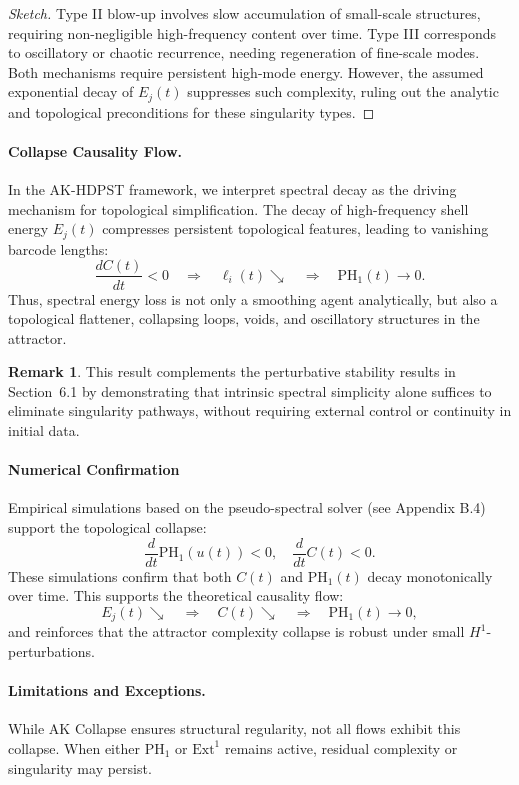 \documentclass[11pt]{article}
\theoremstyle{definition}
\newtheorem{remark}[theorem]{Remark}
\begin{document}
\begin{proof}[Sketch]
Type II blow-up involves slow accumulation of small-scale structures, requiring non-negligible high-frequency content over time. Type III corresponds to oscillatory or chaotic recurrence, needing regeneration of fine-scale modes. Both mechanisms require persistent high-mode energy. However, the assumed exponential decay of \( E_j(t) \) suppresses such complexity, ruling out the analytic and topological preconditions for these singularity types.
\end{proof}

\paragraph{Collapse Causality Flow.}
In the AK-HDPST framework, we interpret spectral decay as the driving mechanism for topological simplification.  
The decay of high-frequency shell energy $E_j(t)$ compresses persistent topological features, leading to vanishing barcode lengths:
\[
\frac{dC(t)}{dt} < 0 \quad \Rightarrow \quad \ell_i(t) \searrow \quad \Rightarrow \quad \mathrm{PH}_1(t) \to 0.
\]
Thus, spectral energy loss is not only a smoothing agent analytically, but also a topological flattener, collapsing loops, voids, and oscillatory structures in the attractor.

\begin{remark}
This result complements the perturbative stability results in Section~6.1 by demonstrating that intrinsic spectral simplicity alone suffices to eliminate singularity pathways, without requiring external control or continuity in initial data.
\end{remark}

\paragraph{Numerical Confirmation}
Empirical simulations based on the pseudo-spectral solver (see Appendix B.4) support the topological collapse: 
\[
\frac{d}{dt} \mathrm{PH}_1(u(t)) < 0, \quad \frac{d}{dt} C(t) < 0.
\]
These simulations confirm that both $C(t)$ and $\mathrm{PH}_1(t)$ decay monotonically over time.  
This supports the theoretical causality flow:
\[
E_j(t) \searrow \quad \Rightarrow \quad C(t) \searrow \quad \Rightarrow \quad \mathrm{PH}_1(t) \to 0,
\]
and reinforces that the attractor complexity collapse is robust under small $H^1$-perturbations.

\paragraph{Limitations and Exceptions.}
While AK Collapse ensures structural regularity, not all flows exhibit this collapse.  
When either $\mathrm{PH}_1$ or $\mathrm{Ext}^1$ remains active, residual complexity or singularity may persist.
\end{document}
